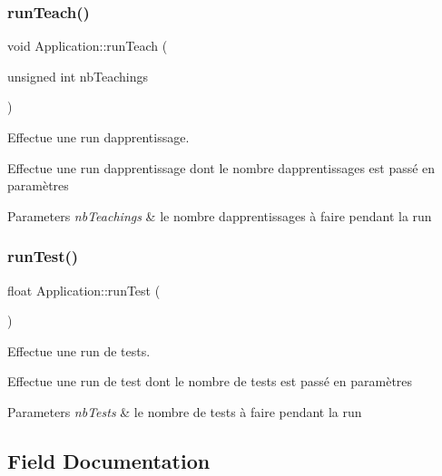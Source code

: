 \subsubsection{\texorpdfstring{run\+Teach()}{runTeach()}}
{\footnotesize\ttfamily void Application\+::run\+Teach (\begin{DoxyParamCaption}\item[{unsigned int}]{nb\+Teachings }\end{DoxyParamCaption})}



Effectue une run d\textquotesingle{}apprentissage. 

Effectue une run d\textquotesingle{}apprentissage dont le nombre d\textquotesingle{}apprentissages est passé en paramètres 
\begin{DoxyParams}{Parameters}
{\em nb\+Teachings} & le nombre d\textquotesingle{}apprentissages à faire pendant la run \\
\hline
\end{DoxyParams}
\mbox{\label{classApplication_abd01b94dfbff9ce3ecf9e77f840a81fa}} 
\subsubsection{\texorpdfstring{run\+Test()}{runTest()}}
{\footnotesize\ttfamily float Application\+::run\+Test (\begin{DoxyParamCaption}{ }\end{DoxyParamCaption})}



Effectue une run de tests. 

Effectue une run de test dont le nombre de tests est passé en paramètres 
\begin{DoxyParams}{Parameters}
{\em nb\+Tests} & le nombre de tests à faire pendant la run \\
\hline
\end{DoxyParams}


\subsection{Field Documentation}
\mbox{\label{classApplication_a4409ee4b27b5142510e5be6d41d2a203}} 
